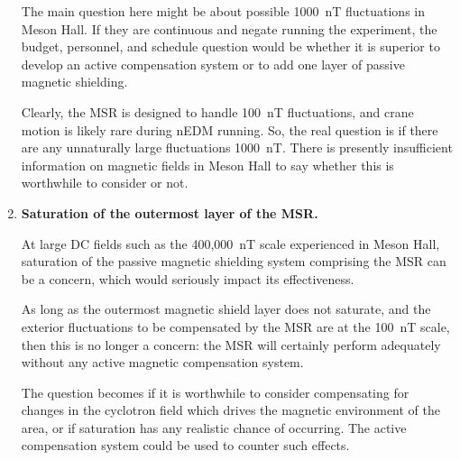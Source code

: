 \begin{enumerate}
    The main question here might be about possible 1000~nT fluctuations in Meson Hall. If they are continuous and negate running the experiment, the budget, personnel, and schedule question would be whether it is superior to develop an active compensation system or to add one layer of passive magnetic shielding.

    Clearly, the MSR is designed to handle 100~nT fluctuations, and crane motion is likely rare during nEDM running. So, the real question is if there are any unnaturally large fluctuations 1000~nT. There is presently insufficient information on magnetic fields in Meson Hall to say whether this is worthwhile to consider or not.


    \item {\bf Saturation of the outermost layer of the MSR.} 
    
    At large DC fields such as the 400,000~nT scale experienced in Meson Hall, saturation of the passive magnetic shielding system comprising the MSR can be a concern, which would seriously impact its effectiveness.
    
    As long as the outermost magnetic shield layer does not saturate, and the exterior fluctuations to be compensated by the MSR are at the 100~nT scale, then this is no longer a concern:  the MSR will certainly perform adequately without any active magnetic compensation system.
    
    The question becomes if it is worthwhile to consider compensating for changes in the cyclotron field which drives the magnetic environment of the area, or if saturation has any realistic chance of occurring.  The active compensation system could be used to counter such effects.
    
    
    
    


\end{enumerate}
